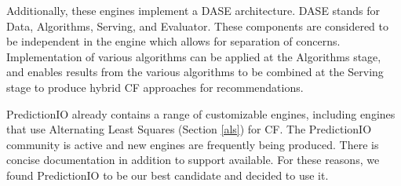 Additionally, these engines implement a DASE architecture. DASE stands for Data, Algorithms, Serving, and Evaluator. These components are considered to be independent in the engine which allows for separation of concerns. Implementation of various algorithms can be applied at the Algorithms stage, and enables results from the various algorithms to be combined at the Serving stage to produce hybrid CF approaches for recommendations.

PredictionIO already contains a range of customizable engines, including engines that use Alternating Least Squares (Section \ref{als}) for CF. The PredictionIO community is active and new engines are frequently being produced. There is concise documentation in addition to support available. For these reasons, we found PredictionIO to be our best candidate and decided to use it. 




